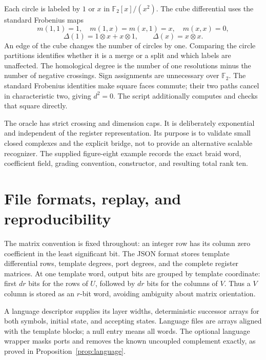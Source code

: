 \documentclass[11pt,letterpaper]{article}
\newcommand{\F}{{\mathbb F_2}}
\newcommand{\code}[1]{\texttt{\detokenize{#1}}}
\theoremstyle{definition}
\theoremstyle{remark}
\numberwithin{equation}{section}
\begin{document}
Each circle is labeled by $1$ or $x$ in $\F[x]/(x^2)$. The cube differential
uses the standard Frobenius maps
\[
 m(1,1)=1,\quad m(1,x)=m(x,1)=x,\quad m(x,x)=0,
\]
\[
 \Delta(1)=1\otimes x+x\otimes1,\qquad \Delta(x)=x\otimes x.
\]
An edge of the cube changes the number of circles by one. Comparing the
circle partitions identifies whether it is a merge or a split and which
labels are unaffected. The homological degree is the number of one
resolutions minus the number of negative crossings. Sign assignments are
unnecessary over $\F$. The standard Frobenius identities make square faces
commute; their two paths cancel in characteristic two, giving $d^2=0$.
The script additionally computes and checks that square directly.

The oracle has strict crossing and dimension caps. It is deliberately
exponential and independent of the register representation. Its purpose is
to validate small closed complexes and the explicit bridge, not to provide
an alternative scalable recognizer. The supplied figure-eight example
records the exact braid word, coefficient field, grading convention,
constructor, and resulting total rank ten.

\section{File formats, replay, and reproducibility}
\label{app:files}
The matrix convention is fixed throughout: an integer row has its column
zero coefficient in the least significant bit. The JSON format
\code{portkh-1} stores template differential rows, template degrees, port
degrees, and the complete register matrices. At one template word, output
bits are grouped by template coordinate: first $d r$ bits for the rows of
$U$, followed by $d r$ bits for the columns of $V$. Thus a $V$ column is
stored as an $r$-bit word, avoiding ambiguity about matrix orientation.

A language descriptor supplies its layer widths, deterministic successor
arrays for both symbols, initial state, and accepting states. Language
files are arrays aligned with the template blocks; a null entry means
all words. The optional language wrapper masks ports and removes the
known uncoupled complement exactly, as proved in
Proposition~\ref{prop:language}.
\end{document}
